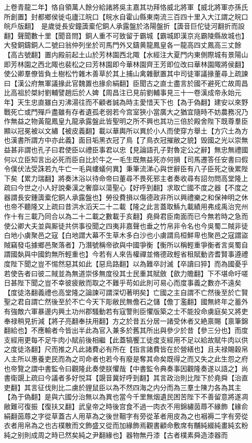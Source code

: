 上卷青龍二年】恪自領萬人餘分給諸將吳主嘉其功拜恪威北將軍【威北將軍亦孫氏所創置】封都鄉侯徙屯廬江皖口【皖水自霍山縣東南流三百四十里入大江謂之皖口皖戶版翻】　是歲徙長安鐘簴槖佗銅人承露盤於洛陽盤折【簴音巨佗徒河翻折而設翻】聲聞數十里【聞音問】銅人重不可致留于霸城【霸城即漢京兆霸陵縣故城也】大發銅鑄銅人二號曰翁仲列坐於司馬門外又鑄黄龍鳳皇各一龍高四丈鳳高三丈餘【高古號翻】置内殿前起土山於芳林園西北陬【水經注大夏門内東側際城有景陽山即芳林園之西北陬也裴松之曰芳林園即今華林園齊王芳即位改曰華林園陬將侯翻】使公卿羣僚皆負土樹松竹雜木善草於其上捕山禽雜獸置其中司徒軍議掾董尋上疏諫曰【漢公府無軍議掾此官魏置也掾俞絹翻】臣聞古之直士盡言於國不避死亡故周昌比高祖於桀紂劉輔譬趙后於人婢【周昌注已見前劉輔事見三十一卷漢成帝永始元年】天生忠直雖白刃沸湯往而不顧者誠為時主愛惜天下也【為于偽翻】建安以來野戰死亡或門殫戶盡雖有存者遺孤老弱若今宫室狹小當廣大之猶宜隨時不妨農務况乃作無益之物黃龍鳳皇九龍承露盤此皆聖明之所不興也其功三倍於殿舍陛下既尊羣臣顯以冠冕被以文繡【被皮義翻】載以華輿所以異於小人而使穿方舉土【方穴土為方也漢書所謂方中亦此義】面目垢黑衣冠了鳥【了鳥衣冠摧敝之貌】毁國之光以崇無益甚非謂也孔子曰君使臣以禮臣事君以忠【見論語孔子對魯定公之辭】無忠無禮國何以立臣知言出必死而臣自比於牛之一毛生既無益死亦何損【司馬遷答任安書曰假令僕伏法受誅若九牛亡一毛與螻蟻何異】秉筆流涕心與世辭臣有八子臣死之後累陛下矣【累力瑞翻】將奏沐浴以待命帝曰董尋不畏死邪主者奏收尋有詔勿問高堂隆上疏曰今世之小人好說秦漢之奢靡以蕩聖心【好呼到翻】求取亡國不度之器【不度之器謂長安鍾簴槖佗銅人承露盤也】勞役費損以傷德政非所以興禮樂之和保神明之休也帝不聽隆又上疏曰昔洪水滔天二十二載【隆之此言蓋取鯀九載績用弗成禹治兖州作十有三載乃同合以為二十二載之數載于亥翻】堯舜君臣南面而已今無若時之急而使公卿大夫並與厮徒共供事役聞之四夷非嘉聲也垂之竹帛非令名也今吳蜀二賊非徒白地小虜聚邑之寇【白地謂大幕不生草木多白沙也小虜謂烏桓鮮卑也聚邑之寇謂盜賊竊發屯據鄉邑聚落者】乃潛號稱帝欲與中國爭衡【衡所以稱輕重爭衡者言吳蜀自謂國埶與中國鈞無所輕重也】今若有人來告權禪並脩德政輕省租賦動咨耆賢事遵禮度陛下聞之豈不惕然惡其如此【惡烏路翻】以為難卒討滅【卒讀曰猝】而為國憂乎若使告者曰彼二賊並為無道崇侈無度役其士民重其賦斂【歛力贍翻】下不堪命吁嗟日甚陛下聞之豈不幸彼疲敝而取之不難乎苟如此則可易心而度事義之數亦不遠矣【度徒洛翻義禮也高堂隆之論諫可謂深切著明矣】亡國之主自謂不亡然後至於亡賢聖之君自謂亡然後至於不亡今天下彫敝民無儋石之儲【儋丁濫翻】國無終年之蓄外有強敵六軍暴邊内興土功州郡騷動若有寇警則臣懼版築之士不能投命虜庭矣又將吏奉禄稍見折減【將子亮翻奉扶用翻】方之於昔五分居一諸受休者又絶禀賜【禀筆錦翻給也】不應輸者今皆出半此為官入兼多於舊其所出與參少於昔【參三分也】而度支經用更每不足牛肉小賦前後相繼【此蓋犒饗工徒度支經用不足以給故賦牛肉以供之度徒洛翻】尺而推之凡此諸費必有所在【指言諸費皆在於營繕也】且夫禄賜穀帛人主所以惠養吏民而為之司命者也若今有廢是奪其命矣既得之而又失之此生怨之府也帝覽之謂中書監令曰觀隆此奏使朕懼哉【中書監令典奏事因觀隆奏遂以語之】尚書衛覬上疏曰今議者多好悦耳【覬音冀好呼到翻】其言政治則比陛下於堯舜【治直吏翻】其言征伐則比二虜於貍鼠臣以為不然四海之内分而為三羣士陳力各為其主【為于偽翻】是與六國分治無以為異也當今千里無烟遺民困苦陛下不善留意將遂凋敝難可復振【復扶又翻】武皇帝之時後宫食不過一肉衣不用錦繡茵蓐不緣飾【緣俞絹翻茵蓐之字從草蓋古人用草為之後世鞇字有旁從革者用皮為之也裀褥二字有旁從衣者用帛為之也古樸散而文飾盛又從而加緣飾焉觀書顧命敷席有黼純綴純畫純玄粉純之别則成周之時已然矣純之尹翻緣也】器物無丹漆【古者樸素舜造漆器而